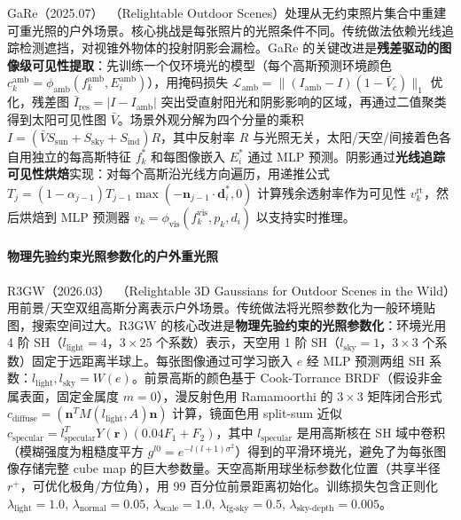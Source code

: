 GaRe（2025.07）~\cite{2507_20512}（Relightable Outdoor Scenes）处理从无约束照片集合中重建可重光照的户外场景。核心挑战是每张照片的光照条件不同。传统做法依赖光线追踪检测遮挡，对视锥外物体的投射阴影会漏检。GaRe 的关键改进是\textbf{残差驱动的图像级可见性提取}：先训练一个仅环境光的模型（每个高斯预测环境颜色 $c_k^{\text{amb}} = \phi_{\text{amb}}(f_k^{\text{amb}}, E_i^{\text{amb}})$），用掩码损失 $\mathcal{L}_{\text{amb}} = \|(I_{\text{amb}} - I)(1-\bar{V}_c)\|_1$ 优化，残差图 $\bar{I}_{\text{res}} = |I - I_{\text{amb}}|$ 突出受直射阳光和阴影影响的区域，再通过二值聚类得到太阳可见性图 $\bar{V}$。场景外观分解为四个分量的乘积 $I = (\bar{V} S_{\text{sun}} + S_{\text{sky}} + S_{\text{ind}}) R$，其中反射率 $R$ 与光照无关，太阳/天空/间接着色各自用独立的每高斯特征 $f_k^{*}$ 和每图像嵌入 $E_i^{*}$ 通过 MLP 预测。阴影通过\textbf{光线追踪可见性烘焙}实现：对每个高斯沿光线方向遍历，用递推公式 $T_j = (1-\alpha_{j-1})T_{j-1} \max(-\mathbf{n}_{j-1} \cdot \mathbf{d}_i^*, 0)$ 计算残余透射率作为可见性 $v_k^{\text{rt}}$，然后烘焙到 MLP 预测器 $v_k = \phi_{\text{vis}}(f_k^{\text{vis}}, p_k, d_i)$ 以支持实时推理。

\paragraph{物理先验约束光照参数化的户外重光照}

R3GW（2026.03）~\cite{2603_02801}（Relightable 3D Gaussians for Outdoor Scenes in the Wild）用前景/天空双组高斯分离表示户外场景。传统做法将光照参数化为一般环境贴图，搜索空间过大。R3GW 的核心改进是\textbf{物理先验约束的光照参数化}：环境光用 4 阶 SH（$l_{\text{light}}=4$，$3 \times 25$ 个系数）表示，天空用 1 阶 SH（$l_{\text{sky}}=1$，$3 \times 3$ 个系数）固定于远距离半球上。每张图像通过可学习嵌入 $e$ 经 MLP 预测两组 SH 系数：$l_{\text{light}}, l_{\text{sky}} = W(e)$。前景高斯的颜色基于 Cook-Torrance BRDF（假设非金属表面，固定金属度 $m=0$），漫反射色用 Ramamoorthi 的 $3 \times 3$ 矩阵闭合形式 $c_{\text{diffuse}} = (\mathbf{n}^T M(l_{\text{light}}, A) \mathbf{n})$ 计算，镜面色用 split-sum 近似 $c_{\text{specular}} = l_{\text{specular}}^T Y(\mathbf{r}) (0.04 F_1 + F_2)$，其中 $l_{\text{specular}}$ 是用高斯核在 SH 域中卷积（模糊强度为粗糙度平方 $g^{l0} = e^{-l(l+1)\sigma^2}$）得到的平滑环境光，避免了为每张图像存储完整 cube map 的巨大参数量。天空高斯用球坐标参数化位置（共享半径 $r^+$，可优化极角/方位角），用 99 百分位前景距离初始化。训练损失包含正则化 $\lambda_{\text{light}}=1.0$, $\lambda_{\text{normal}}=0.05$, $\lambda_{\text{scale}}=1.0$, $\lambda_{\text{fg-sky}}=0.5$, $\lambda_{\text{sky-depth}}=0.005$。

